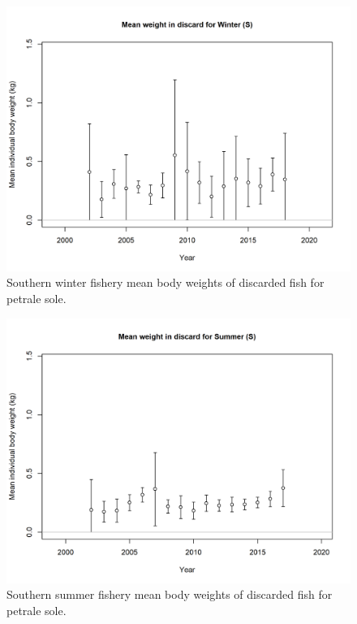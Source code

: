 \documentclass[12pt,]{article}
\begin{document}
\FloatBarrier

\begin{figure}
\centering
\includegraphics{r4ss/plots_mod1/bodywt_data_fltWinter (S).png}
\caption{Southern winter fishery mean body weights of discarded fish for
petrale sole. \label{fig:sw_bodywt}}
\end{figure}

\FloatBarrier

\begin{figure}
\centering
\includegraphics{r4ss/plots_mod1/bodywt_data_fltSummer (S).png}
\caption{Southern summer fishery mean body weights of discarded fish for
petrale sole. \label{fig:ss_bodywt}}
\end{figure}
\end{document}
